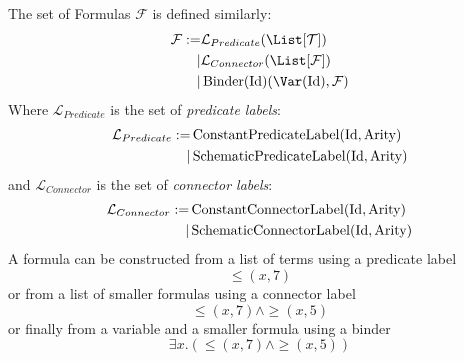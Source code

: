 \begin{defin}[Formulas]
The set of Formulas $\mathcal{F}$ is defined similarly:
\begin{equation}
\begin{split}
\mathcal{F} := & \mathcal{L}_{Predicate}(\List[\mathcal{T}]) \\
              \mid & \mathcal{L}_{Connector}(\List[\mathcal{F}]) \\
              \mid & \operatorname{Binder}(\textnormal{Id})(\Var(\textnormal{Id}), \mathcal{F})
\end{split}
\end{equation}
Where $\mathcal{L}_{Predicate}$ is the set of \textit{predicate labels}:
\begin{equation}
\begin{split}
\mathcal{L}_{Predicate} := & \operatorname{ConstantPredicateLabel}(\textnormal{Id}, \textnormal{Arity})\\
              \mid & \operatorname{SchematicPredicateLabel}(\textnormal{Id}, \textnormal{Arity})
\end{split}
\end{equation}
and $\mathcal{L}_{Connector}$ is the set of \textit{connector labels}:
\begin{equation}
\begin{split}
\mathcal{L}_{Connector} := & \operatorname{ConstantConnectorLabel}(\textnormal{Id}, \textnormal{Arity})\\
              \mid & \operatorname{SchematicConnectorLabel}(\textnormal{Id}, \textnormal{Arity})
\end{split}
\end{equation}
A formula can be constructed from a list of terms using a predicate label
$${\leq}(x, 7)$$
or from a list of smaller formulas using a connector label
$${\leq}(x, 7) \land {\geq}(x, 5)$$
or finally from a variable and a smaller formula using a binder
$$\exists x. \left({\leq}(x, 7) \land {\geq}(x, 5)\right)$$


\end{defin}
